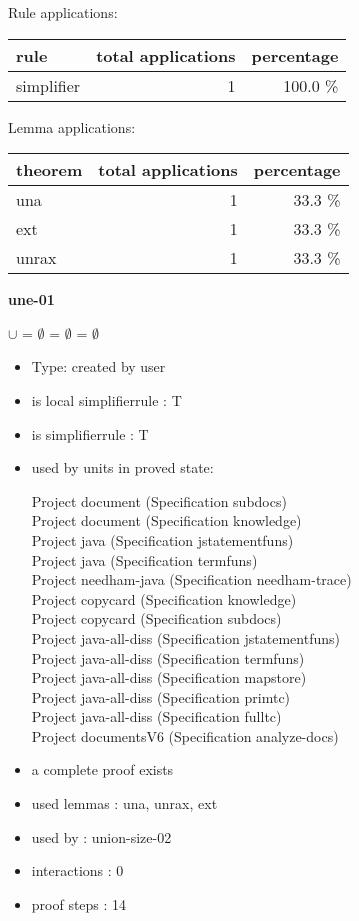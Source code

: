 \documentclass[a4paper]{article}
\begin{document}
Rule applications:

\begin{supertabular}{l|r|r}
rule	        & total applications & percentage \\ \hline
simplifier & 1 & 100.0 \% \\

\end{supertabular}

Lemma applications:

\begin{supertabular}{l|r|r}
theorem	        & total applications & percentage \\ \hline
una & 1 & 33.3 \% \\
ext & 1 & 33.3 \% \\
unrax & 1 & 33.3 \% \\

\end{supertabular}
\pagebreak

{\LARGE\bf une-01}\label{lemma-une-01}

\medskip

 \Fol {} $\cup$  = $\emptyset$ \Equiv {} = $\emptyset$ \And {} = $\emptyset$

\begin{itemize}

\item Type: created by user

\item is local simplifierrule : T
\item is simplifierrule : T
\item used by units in proved state:

Project document (Specification subdocs) \\
Project document (Specification knowledge) \\
Project java (Specification jstatementfuns) \\
Project java (Specification termfuns) \\
Project needham-java (Specification needham-trace) \\
Project copycard (Specification knowledge) \\
Project copycard (Specification subdocs) \\
Project java-all-diss (Specification jstatementfuns) \\
Project java-all-diss (Specification termfuns) \\
Project java-all-diss (Specification mapstore) \\
Project java-all-diss (Specification primtc) \\
Project java-all-diss (Specification fulltc) \\
Project documentsV6 (Specification analyze-docs)
\item       a complete proof exists
\item       used lemmas  : una, unrax, ext
\item       used by      : union-size-02
\item       interactions : 0
\item       proof steps  : 14
\end{itemize}
\end{document}
